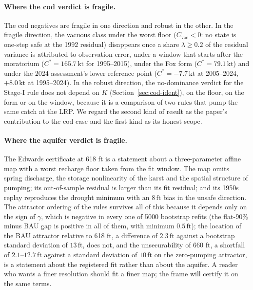 \documentclass[11pt,a4paper]{article}
\theoremstyle{plain}
\theoremstyle{definition}
\theoremstyle{remark}
\newcommand{\Cstar}{C^{*}}
\newcommand{\Cvac}{C_{\mathrm{vac}}}
\newcommand{\kt}{\,\mathrm{kt}}
\newcommand{\ft}{\,\mathrm{ft}}
\begin{document}
\paragraph{Where the cod verdict is fragile.}
The cod negatives are fragile in one direction and robust in the other. In the fragile direction, the vacuous class under the worst floor ($\Cvac<0$: no state is one-step safe at the 1992 residual) disappears once a share $\lambda\ge0.2$ of the residual variance is attributed to observation error, under a window that starts after the moratorium ($\Cstar=165.7\kt$ for 1995--2015), under the Fox form ($\Cstar=79.1\kt$) and under the 2024 assessment's lower reference point ($\Cstar=-7.7\kt$ at 2005--2024, $+8.0\kt$ at 1995--2024). In the robust direction, the no-dominance verdict for the Stage-I rule does not depend on $K$ (Section~\ref{sec:cod-ident}), on the floor, on the form or on the window, because it is a comparison of two rules that pump the same catch at the LRP. We regard the second kind of result as the paper's contribution to the cod case and the first kind as its honest scope.

\paragraph{Where the aquifer verdict is fragile.}
The Edwards certificate at 618 ft is a statement about a three-parameter affine map with a worst recharge floor taken from the fit window. The map omits spring discharge, the storage nonlinearity of the karst and the spatial structure of pumping; its out-of-sample residual is larger than its fit residual; and its 1950s replay reproduces the drought minimum with an $8\ft$ bias in the unsafe direction. The attractor ordering of the rules survives all of this because it depends only on the sign of $\gamma$, which is negative in every one of 5000 bootstrap refits (the flat-90\% minus BAU gap is positive in all of them, with minimum $0.5\ft$); the location of the BAU attractor relative to 618 ft, a difference of $2.3\ft$ against a bootstrap standard deviation of $13\ft$, does not, and the unsecurability of 660 ft, a shortfall of $2.1$--$12.7\ft$ against a standard deviation of $10\ft$ on the zero-pumping attractor, is a statement about the registered fit rather than about the aquifer. A reader who wants a finer resolution should fit a finer map; the frame will certify it on the same terms.
\end{document}
